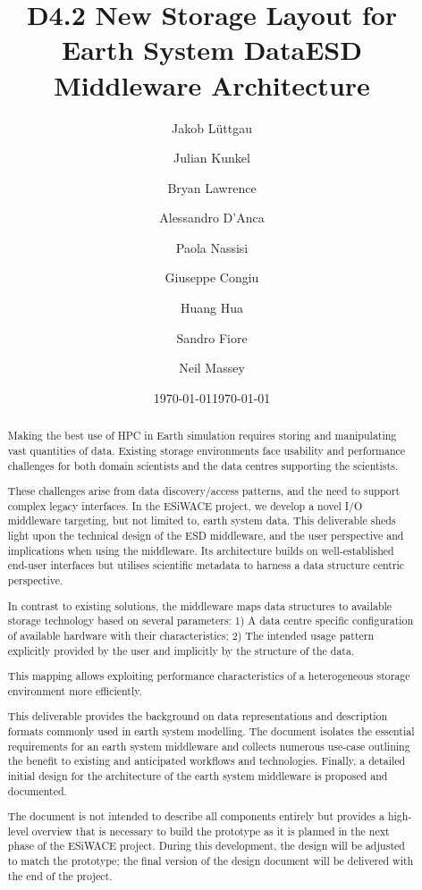 \documentclass[a4paper,11pt]{esiwace-modified}
\title{D4.2 New Storage Layout for Earth System Data}
\author{Jakob Lüttgau
	\and Julian Kunkel
	\and Bryan Lawrence
	\and Alessandro D'Anca
	\and Paola Nassisi
	\and Giuseppe Congiu
	\and Huang Hua
	\and Sandro Fiore
	\and Neil Massey
}
\date{\today} %
\begin{document}
\title{ESD Middleware Architecture}
\date{\today}

\maketitle

\tableofcontents

\begin{abstract}
Making the best use of HPC in Earth simulation requires storing and manipulating vast quantities of data.
Existing storage environments face usability and performance challenges for both domain scientists and the data centres supporting the scientists.

These challenges arise from data discovery/access patterns, and the need to support complex legacy interfaces. In the ESiWACE project, we develop a novel I/O middleware targeting, but not limited to, earth system data.
This deliverable sheds light upon the technical design of the ESD middleware, and the user perspective and implications when using the middleware.
Its architecture builds on well-established end-user interfaces but utilises scientific metadata to harness a data structure centric perspective.

In contrast to existing solutions, the middleware maps data structures to available storage technology based on several parameters:
1) A data centre specific configuration of available hardware with their characteristics;
2) The intended usage pattern explicitly provided by the user and implicitly by the structure of the data.

This mapping allows exploiting performance characteristics of a heterogeneous storage environment more efficiently.

This deliverable provides the background on data representations and description formats commonly used in earth system modelling.
The document isolates the essential requirements for an earth system middleware and collects numerous use-case outlining the benefit to existing and anticipated workflows and technologies.
Finally, a detailed initial design for the architecture of the earth system middleware is proposed and documented.

The document is not intended to describe all components entirely but provides a high-level overview that is necessary to build the prototype as it is planned in the next phase of the ESiWACE project.
During this development, the design will be adjusted to match the prototype; the final version of the design document will be delivered with the end of the project.
\end{abstract}
\end{document}
